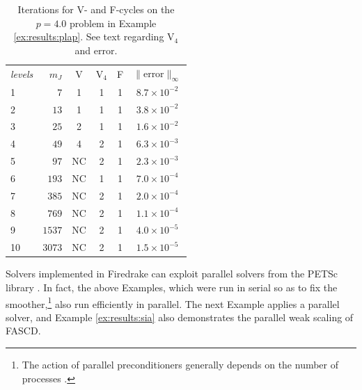\documentclass[letterpaper,final,12pt,reqno]{amsart}
\theoremstyle{cstyle}
\theoremstyle{cstyle*}
\theoremstyle{dstyle}
\numberwithin{equation}{section}
\numberwithin{figure}{section}
\numberwithin{table}{section}
\numberwithin{theorem}{section}
\begin{document}
\begin{table}[ht]
\begin{tabular}{lr@{\hskip 7mm}c@{\hskip 4mm}c@{\hskip 4mm}c@{\hskip 6mm}c}
\emph{levels} & $m_J$ & V & V$_4$ & F & $\|$error$\|_\infty$ \\ \cmidrule{1-6}
 1 &    $7$ &  1 &  1 &  1 & $8.7 \times 10^{-2}$ \\
 2 &   $13$ &  1 &  1 &  1 & $3.8 \times 10^{-2}$ \\
 3 &   $25$ &  2 &  1 &  1 & $1.6 \times 10^{-2}$ \\
 4 &   $49$ &  4 &  2 &  1 & $6.3 \times 10^{-3}$ \\
 5 &   $97$ & NC &  2 &  1 & $2.3 \times 10^{-3}$ \\
 6 &  $193$ & NC &  1 &  1 & $7.0 \times 10^{-4}$ \\
 7 &  $385$ & NC &  2 &  1 & $2.0 \times 10^{-4}$ \\
 8 &  $769$ & NC &  2 &  1 & $1.1 \times 10^{-4}$ \\
 9 & $1537$ & NC &  2 &  1 & $4.0 \times 10^{-5}$ \\
10 & $3073$ & NC &  2 &  1 & $1.5 \times 10^{-5}$
\end{tabular}
\bigskip
\caption{Iterations for V- and F-cycles on the $p=4.0$ problem in Example \ref{ex:results:plap}.  See text regarding V$_4$ and error.}
\label{tab:results:degenerateplap1d}
\end{table}

Solvers implemented in Firedrake can exploit parallel solvers from the PETSc library \cite{Balayetal2023}.  In fact, the above Examples, which were run in serial so as to fix the smoother,\footnote{The action of parallel preconditioners generally depends on the number of processes \cite[for example]{Bueler2021}.} also run efficiently in parallel.  The next Example applies a parallel solver, and Example \ref{ex:results:sia} also demonstrates the parallel weak scaling \cite{Bueler2021} of FASCD.
\end{document}
